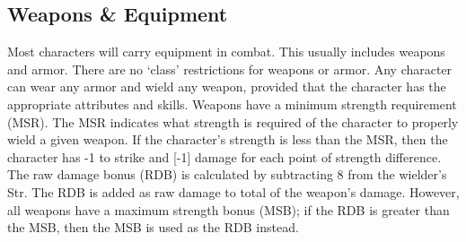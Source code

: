 \documentclass[twoside]{book}
\begin{document}
\subsection{Weapons \& Equipment}
     Most characters will carry equipment in combat. This
               usually includes weapons and armor. There are no
               `class' restrictions for weapons or armor. Any
               character can wear any armor and wield any weapon,
               provided that the character has the appropriate attributes
               and skills.  Weapons have a minimum strength requirement (MSR).
               The MSR indicates what strength is required of the
               character to properly wield a given weapon. If the
               character's strength is less than the MSR, then the
               character has -1 to strike and [-1] damage for each point
               of strength difference.  The raw damage bonus (RDB) is calculated by
               subtracting 8 from the wielder's Str. The RDB is
               added as raw damage to total of the weapon's damage.
               However, all weapons have a maximum strength bonus (MSB);
               if the RDB is greater than the MSB, then the MSB is used
               as the RDB instead. 
  
\end{document}

